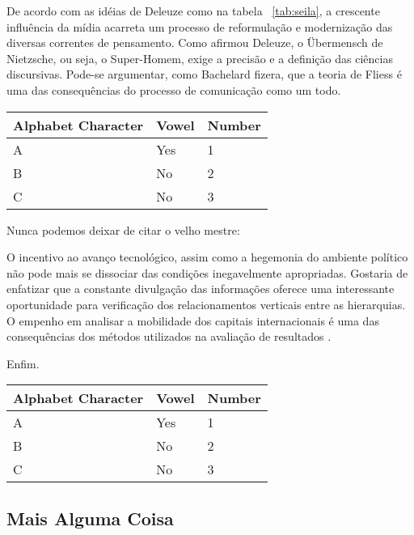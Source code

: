 \documentclass[chapter=TITLE,section=Title,espaco=duplo,tocpage=plain,appendix=Name,floatnumber=continuous]{abnt}
\begin{document}
De acordo com as idéias de Deleuze como na tabela ~\ref{tab:seila}, a crescente
influência da mídia acarreta um processo de reformulação e modernização das
diversas correntes de pensamento.  Como afirmou Deleuze, o Übermensch de
Nietzsche, ou seja, o Super-Homem, exige a precisão e a definição das ciências
discursivas.  Pode-se argumentar, como Bachelard fizera, que a teoria de Fliess
é uma das consequências do processo de comunicação como um todo.

\begin{table}[h!b!p!]
\centering
\begin{tabular}{lll}
\hline
Alphabet Character & Vowel & Number \\
\hline
A & Yes & 1 \\
B & No & 2 \\
C & No & 3 \\
\hline
\end{tabular}
\end{table}

Nunca podemos deixar de citar o velho mestre:

\begin{citacao}
O incentivo ao avanço tecnológico, assim como a hegemonia do ambiente
político não pode mais se dissociar das condições inegavelmente
apropriadas. Gostaria de enfatizar que a constante divulgação das
informações oferece uma interessante oportunidade para verificação dos
relacionamentos verticais entre as hierarquias. O empenho em analisar a
mobilidade dos capitais internacionais é uma das consequências dos métodos
utilizados na avaliação de resultados \cite{semolini2002support}.
\end{citacao}

Enfim.

\begin{table}
\centering
\begin{tabular}{lll}
\hline
Alphabet Character & Vowel & Number \\
\hline
A & Yes & 1 \\
B & No & 2 \\
C & No & 3 \\
\hline
\end{tabular}
\end{table}

\subsection{Mais Alguma Coisa}
\end{document}
